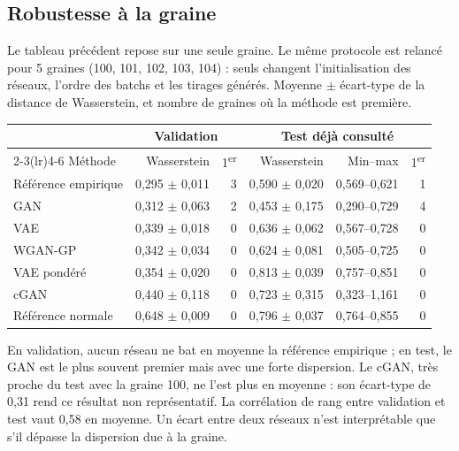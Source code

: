 \subsection*{Robustesse à la graine}
Le tableau précédent repose sur une seule graine. Le même protocole est relancé pour 5 graines (100, 101, 102, 103, 104) : seuls changent l'initialisation des réseaux, l'ordre des batchs et les tirages générés. Moyenne $\pm$ écart-type de la distance de Wasserstein, et nombre de graines où la méthode est première.

\begin{center}\small
\begin{tabular}{lrrrrr}
\toprule
& \multicolumn{2}{c}{Validation} & \multicolumn{3}{c}{Test déjà consulté} \\
\cmidrule(lr){2-3}\cmidrule(lr){4-6}
Méthode & Wasserstein & 1\textsuperscript{er} & Wasserstein & Min--max & 1\textsuperscript{er} \\
\midrule
Référence empirique & 0{,}295 $\pm$ 0{,}011 & 3 & 0{,}590 $\pm$ 0{,}020 & 0{,}569--0{,}621 & 1 \\
GAN & 0{,}312 $\pm$ 0{,}063 & 2 & 0{,}453 $\pm$ 0{,}175 & 0{,}290--0{,}729 & 4 \\
VAE & 0{,}339 $\pm$ 0{,}018 & 0 & 0{,}636 $\pm$ 0{,}062 & 0{,}567--0{,}728 & 0 \\
WGAN-GP & 0{,}342 $\pm$ 0{,}034 & 0 & 0{,}624 $\pm$ 0{,}081 & 0{,}505--0{,}725 & 0 \\
VAE pondéré & 0{,}354 $\pm$ 0{,}020 & 0 & 0{,}813 $\pm$ 0{,}039 & 0{,}757--0{,}851 & 0 \\
cGAN & 0{,}440 $\pm$ 0{,}118 & 0 & 0{,}723 $\pm$ 0{,}315 & 0{,}323--1{,}161 & 0 \\
Référence normale & 0{,}648 $\pm$ 0{,}009 & 0 & 0{,}796 $\pm$ 0{,}037 & 0{,}764--0{,}855 & 0 \\
\bottomrule
\end{tabular}\end{center}
En validation, aucun réseau ne bat en moyenne la référence empirique ; en test, le GAN est le plus souvent premier mais avec une forte dispersion. Le cGAN, très proche du test avec la graine 100, ne l'est plus en moyenne : son écart-type de 0{,}31 rend ce résultat non représentatif. La corrélation de rang entre validation et test vaut 0{,}58 en moyenne. Un écart entre deux réseaux n'est interprétable que s'il dépasse la dispersion due à la graine.

